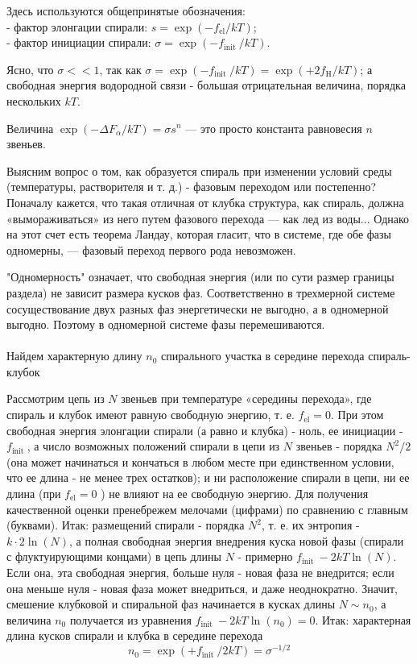 \documentclass[
11pt,%
tightenlines,%
twoside,%
onecolumn,%
nofloats,%
nobibnotes,%
nofootinbib,%
superscriptaddress,%
noshowpacs,%
centertags]%
{revtex4}
\begin{document}
Здесь используются общепринятые обозначения:
\\- фактор элонгации спирали: $s=\exp \left(-f_{\mathrm{el}} / k T\right)$;
\\- фактор инициации спирали: $\sigma=\exp \left(-f_{\text {init }} / k T\right)$.

Ясно, что $\sigma<<1$, так как $\sigma=\exp \left(-f_{\text {init }} / k T\right)=\exp \left(+2 f_{\mathrm{H}} / k T\right)$; а свободная энергия водородной связи - большая отрицательная величина, порядка нескольких $k T$.

Величина $\exp \left(-\Delta F_\alpha / k T\right)=\sigma s^n$ — это просто константа равновесия $n$ звеньев.

Выясним вопрос о том, как образуется спираль при изменении условий среды (температуры, растворителя и т. д.) - фазовым переходом или постепенно?
Поначалу кажется, что такая отличная от клубка структура, как спираль, должна «вымораживаться» из него путем фазового перехода — как лед из воды...
Однако на этот счет есть теорема Ландау, которая гласит, что в системе, где обе фазы одномерны, — фазовый переход первого рода невозможен.

"Одномерность" означает, что свободная энергия (или по сути размер границы раздела) не зависит размера кусков фаз. Соответственно в трехмерной системе сосуществование двух разных фаз энергетически не выгодно, а в одномерной выгодно. Поэтому в одномерной системе фазы перемешиваются. 
\\ \\Найдем характерную длину $n_0$ спирального участка в середине перехода спираль-клубок

Рассмотрим цепь из $N$ звеньев при температуре «середины перехода», где спираль и клубок имеют равную свободную энергию, т. е. $f_{\mathrm{el}}=0$. При этом свободная энергия элонгации спирали (а равно и клубка) - ноль, ее инициации - $f_{\text {init }}$, а число возможных положений спирали в цепи из $N$ звеньев - порядка $N^2 / 2$ (она может начинаться и кончаться в любом месте при единственном условии, что ее длина - не менее трех остатков); и ни расположение спирали в цепи, ни ее длина (при $f_{\mathrm{el}}=0$ ) не влияют на ее свободную энергию. Для получения качественной оценки пренебрежем мелочами (цифрами) по сравнению с главным (буквами). Итак: размещений спирали - порядка $N^2$, т. е. их энтропия - $k \cdot 2 \ln (N)$, а полная свободная энергия внедрения куска новой фазы (спирали с флуктуирующими концами) в цепь длины $N$ - примерно $f_{\text {init }}-2 k T \ln (N)$. Если она, эта свободная энергия, больше нуля - новая фаза не внедрится; если она меньше нуля - новая фаза может внедриться, и даже неоднократно. Значит, смешение клубковой и спиральной фаз начинается в кусках длины $N \sim n_0$, а величина $n_0$ получается из уравнения $f_{\text {init }}-2 k T \ln \left(n_0\right)=0$. Итак: характерная длина кусков спирали и клубка в середине перехода
\begin{equation}
	n_0=\exp \left(+f_{\text {init }} / 2 k T\right)=\sigma^{-1 / 2}
\end{equation}
\end{document}
